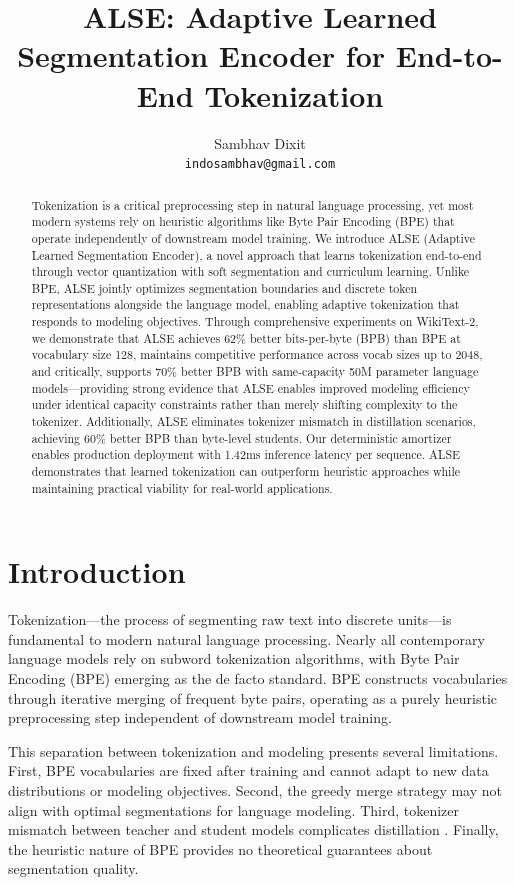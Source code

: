 \documentclass{article}
\title{ALSE: Adaptive Learned Segmentation Encoder for End-to-End Tokenization}
\author{
  Sambhav Dixit \\
  \texttt{indosambhav@gmail.com}
}
\date{}
\begin{document}
\maketitle

\begin{abstract}
Tokenization is a critical preprocessing step in natural language processing, yet most modern systems rely on heuristic algorithms like Byte Pair Encoding (BPE) that operate independently of downstream model training. We introduce ALSE (Adaptive Learned Segmentation Encoder), a novel approach that learns tokenization end-to-end through vector quantization with soft segmentation and curriculum learning. Unlike BPE, ALSE jointly optimizes segmentation boundaries and discrete token representations alongside the language model, enabling adaptive tokenization that responds to modeling objectives. Through comprehensive experiments on WikiText-2, we demonstrate that ALSE achieves 62\% better bits-per-byte (BPB) than BPE at vocabulary size 128, maintains competitive performance across vocab sizes up to 2048, and critically, supports 70\% better BPB with same-capacity 50M parameter language models—providing strong evidence that ALSE enables improved modeling efficiency under identical capacity constraints rather than merely shifting complexity to the tokenizer. Additionally, ALSE eliminates tokenizer mismatch in distillation scenarios, achieving 60\% better BPB than byte-level students. Our deterministic amortizer enables production deployment with 1.42ms inference latency per sequence. ALSE demonstrates that learned tokenization can outperform heuristic approaches while maintaining practical viability for real-world applications.
\end{abstract}

\section{Introduction}

Tokenization—the process of segmenting raw text into discrete units—is fundamental to modern natural language processing. Nearly all contemporary language models rely on subword tokenization algorithms, with Byte Pair Encoding (BPE) \cite{sennrich2016bpe} emerging as the de facto standard. BPE constructs vocabularies through iterative merging of frequent byte pairs, operating as a purely heuristic preprocessing step independent of downstream model training.

This separation between tokenization and modeling presents several limitations. First, BPE vocabularies are fixed after training and cannot adapt to new data distributions or modeling objectives. Second, the greedy merge strategy may not align with optimal segmentations for language modeling. Third, tokenizer mismatch between teacher and student models complicates distillation \cite{sanh2019distilbert}. Finally, the heuristic nature of BPE provides no theoretical guarantees about segmentation quality.
\end{document}
